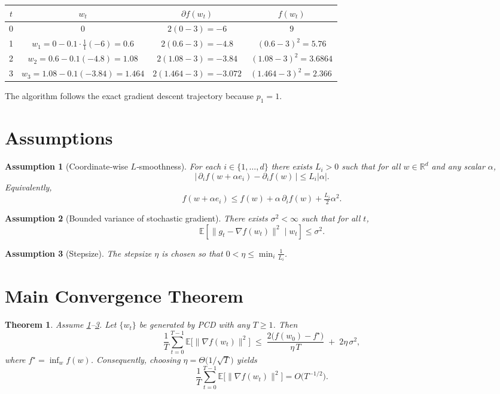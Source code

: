 \documentclass[11pt]{article}
\newtheorem{theorem}{Theorem}
\newtheorem{assumption}{Assumption}
\newcommand{\E}{\mathbb{E}}
\newcommand{\R}{\mathbb{R}}
\newcommand{\grad}{\nabla}
\begin{document}
\begin{center}
\begin{tabular}{c|c|c|c}
$t$ & $w_t$ & $\partial f(w_t)$ & $f(w_t)$\\ \hline
0 & $0$ & $2(0-3)=-6$ & $9$\\
1 & $w_1=0-0.1\cdot\frac{1}{1}(-6)=0.6$ & $2(0.6-3)=-4.8$ & $(0.6-3)^2=5.76$\\
2 & $w_2=0.6-0.1(-4.8)=1.08$ & $2(1.08-3)=-3.84$ & $(1.08-3)^2=3.6864$\\
3 & $w_3=1.08-0.1(-3.84)=1.464$ & $2(1.464-3)=-3.072$ & $(1.464-3)^2=2.366\,$
\end{tabular}
\end{center}
The algorithm follows the exact gradient descent trajectory because $p_1=1$.

\newpage
\section*{Assumptions}
\begin{assumption}[Coordinate‑wise $L$‑smoothness]\label{ass:smooth}
For each $i\in\{1,\dots,d\}$ there exists $L_i>0$ such that for all $w\in\R^{d}$ and any scalar $\alpha$,
\[
\bigl|\,\partial_i f(w+ \alpha e_i)-\partial_i f(w)\,\bigr|\le L_i |\alpha|.
\]
Equivalently,
\[
f(w+ \alpha e_i)\le f(w)+\alpha\,\partial_i f(w)+\tfrac{L_i}{2}\alpha^{2}.
\]
\end{assumption}
\begin{assumption}[Bounded variance of stochastic gradient]\label{ass:var}
There exists $\sigma^{2}<\infty$ such that for all $t$,
\[
\E\!\left[\|g_t-\grad f(w_t)\|^{2}\mid w_t\right]\le \sigma^{2}.
\]
\end{assumption}
\begin{assumption}[Stepsize]\label{ass:stepsize}
The stepsize $\eta$ is chosen so that $0<\eta\le \min_{i}\frac{1}{L_i}$.
\end{assumption}

\section*{Main Convergence Theorem}
\begin{theorem}\label{thm:main}
Assume \ref{ass:smooth}–\ref{ass:stepsize}. Let $\{w_t\}$ be generated by PCD with any $T\ge 1$. Then
\[
\frac{1}{T}\sum_{t=0}^{T-1}\E\bigl[\|\grad f(w_t)\|^{2}\bigr]
\;\le\;
\frac{2\bigl(f(w_0)-f^{\star}\bigr)}{\eta\,T}
\;+\;
2\eta\,\sigma^{2},
\]
where $f^{\star}= \inf_{w}f(w)$.
Consequently, choosing $\eta = \Theta\!\bigl(1/\sqrt{T}\bigr)$ yields
\[
\frac{1}{T}\sum_{t=0}^{T-1}\E\bigl[\|\grad f(w_t)\|^{2}\bigr]=O\!\bigl(T^{-1/2}\bigr).
\]
\end{theorem}
\end{document}
